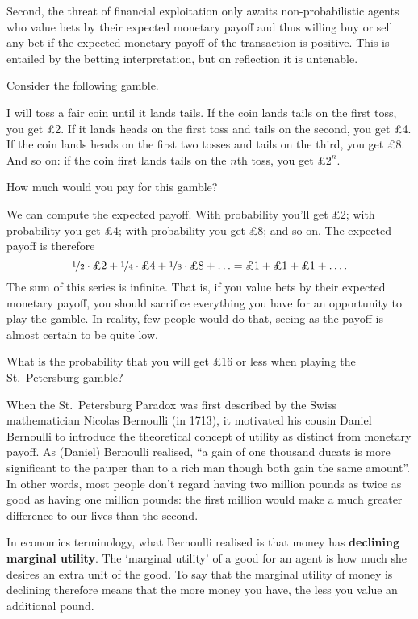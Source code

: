 Second, the threat of financial exploitation only awaits
non-probabilistic agents who value bets by their expected monetary
payoff and thus willing buy or sell any bet if the expected monetary
payoff of the transaction is positive. This is entailed by the betting
interpretation, but on reflection it is untenable.

Consider the following gamble.
\begin{example}
  I will toss a fair coin until it lands tails. If the coin lands tails on
  the first toss, you get £2. If it lands heads on the first
  toss and tails on the second, you get £4. If the coin lands heads on the
  first two tosses and tails on the third, you get £8. And so on: if
  the coin first lands tails on the $n$th toss, you get £$2^n$.
\end{example}
How much would you pay for this gamble? 

We can compute the expected payoff. With probability 
you'll get £2; with probability  you get £4; with
probability  you get £8; and so on. The expected payoff
is therefore
\[
  \nicefrac{1}{2} \cdot \text{£2} + 
  \nicefrac{1}{4} \cdot \text{£4} + 
  \nicefrac{1}{8} \cdot \text{£8} + 
  \ldots = \text{£1} +  \text{£1} +  \text{£1} + \ldots. 
\]
The sum of this series is infinite. That is, if you value bets by
their expected monetary payoff, you should sacrifice everything you
have for an opportunity to play the gamble. In reality, few people
would do that, seeing as the payoff is almost certain to be quite low.

\begin{exercise1}
  What is the probability that you will get £16 or less when playing
  the St.\ Petersburg gamble?
\end{exercise1}

When the St.\ Petersburg Paradox was first described by the Swiss
mathematician Nicolas Bernoulli (in 1713), it motivated his cousin
Daniel Bernoulli to introduce the theoretical concept of utility as
distinct from monetary payoff. As (Daniel) Bernoulli realised, ``a
gain of one thousand ducats is more significant to the pauper than to
a rich man though both gain the same amount''. In other words, most
people don't regard having two million pounds as twice as good as
having one million pounds: the first million would make a much greater
difference to our lives than the second.

In economics terminology, what Bernoulli realised is that money has
\textbf{declining marginal utility}. The `marginal utility' of a good
for an agent is how much she desires an extra unit of the good. To say
that the marginal utility of money is declining therefore means that
the more money you have, the less you value an additional pound.

